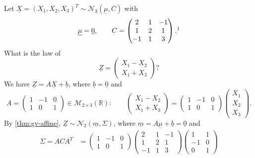 \begin{example}\label{exa:gv-affine}
Let $\underline X=(X_1,X_2,X_3)^T\sim\mathcal N_3(\underline\mu,C)$ with
\[
  \underline\mu=\underline 0,\qquad
  C=\begin{pmatrix}2&1&-1\\1&2&1\\-1&1&3\end{pmatrix}.\footnotemark
\]
What is the law of
\[
  \underline Z=\begin{pmatrix}X_1-X_2\\X_1+X_3\end{pmatrix}?
\]
We have $\underline Z=A\underline X+\underline b$, where $\underline b=\underline 0$ and
\[
  A=\begin{pmatrix}1&-1&0\\1&0&1\end{pmatrix}\in\mathcal M_{2\times3}(\mathbb R):\qquad
  \begin{pmatrix}X_1-X_2\\X_1+X_3\end{pmatrix}=\begin{pmatrix}1&-1&0\\1&0&1\end{pmatrix}
  \begin{pmatrix}X_1\\X_2\\X_3\end{pmatrix}.
\]
By \cref{thm:gv-affine}, $\underline Z\sim\mathcal N_2(\underline m,\Sigma)$, where
$\underline m=A\underline\mu+\underline b=\underline 0$ and
\[
\begin{aligned}
  \Sigma=ACA^T&=\begin{pmatrix}1&-1&0\\1&0&1\end{pmatrix}
  \begin{pmatrix}2&1&-1\\1&2&1\\-1&1&3\end{pmatrix}
  \begin{pmatrix}1&1\\-1&0\\0&1\end{pmatrix}\\

\end{aligned}\]
\end{example}
